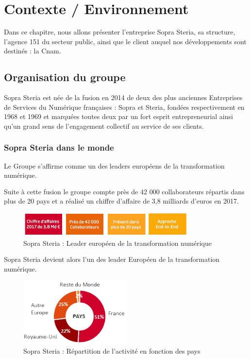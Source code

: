 \chapter{Contexte / Environnement}
\label{chap:premierchapitre}

Dans ce chapitre, nous allons présenter l'entreprise Sopra Steria, sa structure, l'agence 151 du secteur public, ainsi que le client auquel nos développements sont destinés : la Cnam.

\section{Organisation du groupe}

Sopra Steria est née de la fusion en 2014 de deux des plus anciennes Entreprises de Services du Numérique françaises : Sopra et Steria, fondées respectivement en 1968 et 1969 et marquées toutes deux par un fort esprit entrepreneurial ainsi qu'un grand sens de l’engagement collectif au service de ses clients.

\subsection{Sopra Steria dans le monde}

Le Groupe s'affirme comme un des leaders européens de la transformation numérique.

Suite à cette fusion le groupe compte près de 42 000 collaborateurs répartis dans plus de 20 pays et a réalisé un chiffre d’affaire de 3,8 milliards d’euros en 2017.

\begin{figure}[!h]
\centering
\includegraphics[width=0.8\textwidth]{images/chiffres_cles2017.jpg}
\caption{Sopra Steria : Leader européen de la transformation numérique}
\end{figure}

Sopra Steria devient alors l'un des leader Européen de la transformation numérique.

\begin{figure}[!h]
\centering
\includegraphics[width=0.5\textwidth]{images/payssoprasteria.png}
\caption{Sopra Steria : Répartition de l'activité en fonction des pays}
\end{figure}

